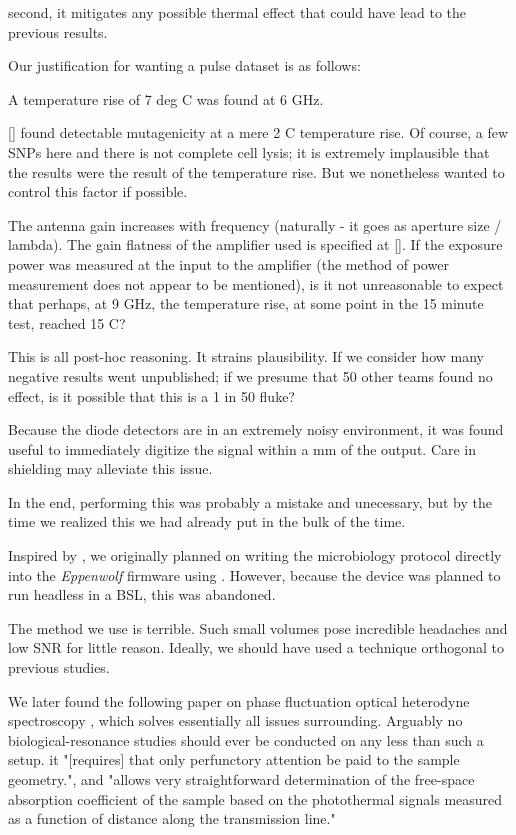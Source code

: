 \documentclass[paper.tex]{subfiles}
\begin{document}
second, it mitigates any possible thermal effect that could have lead to the previous results.

Our justification for wanting a pulse dataset is as follows:

A temperature rise of 7 deg C was found at 6 GHz.

[] found detectable mutagenicity at a mere 2 C temperature rise.
Of course, a few SNPs here and there is not complete cell lysis; it is extremely implausible that
the results were the result of the temperature rise. But we nonetheless wanted to control this factor if possible.

The antenna gain increases with frequency (naturally - it goes as aperture size / lambda).
The gain flatness of the amplifier used is specified at [].
If the exposure power was measured at the input to the amplifier (the method of power measurement does not appear to be mentioned), is it not
unreasonable to expect that perhaps, at 9 GHz, the temperature rise, at some point in the 15 minute test, reached 15 C?

This is all post-hoc reasoning. It strains plausibility. If we consider how many negative results went unpublished;
if we presume that 50 other teams found no effect, is it possible that this is a 1 in 50 fluke?




Because the diode detectors are in an extremely noisy environment, it was found useful to immediately digitize the signal within a mm of the output. Care in shielding may alleviate this issue.

In the end, performing this was probably a mistake and unecessary, but by the time we realized this we had already put in the bulk of the time.

Inspired by \cite{Biocoder2010}, we originally planned on writing the microbiology protocol directly into the {\it Eppenwolf} firmware using \cite{Noweb}.
However, because the device was planned to run headless in a BSL, this was abandoned.

The method we use is terrible. Such small volumes pose incredible headaches and low SNR for little reason.
Ideally, we should have used a technique orthogonal to previous studies.


We later found the following paper on phase fluctuation optical heterodyne spectroscopy \cite{Broadband1988}, which solves essentially all issues surrounding. Arguably no biological-resonance studies should ever be conducted on any less than such a setup.
it "[requires] that only perfunctory attention be paid to the sample geometry.", and "allows very straightforward determination of the free-space absorption
coefficient of the sample based on the photothermal signals measured as a function of distance along the transmission line."
\end{document}
